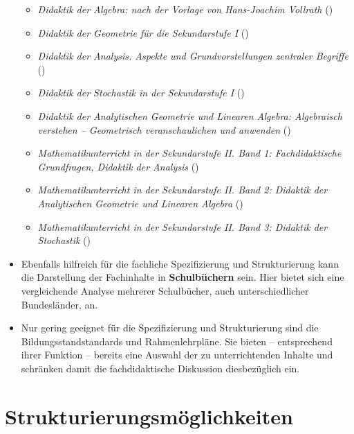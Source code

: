 \documentclass[
]{scrbook}
\providecommand{\tightlist}{%
  \setlength{\itemsep}{0pt}\setlength{\parskip}{0pt}}
\theoremstyle{definition}
\theoremstyle{definition}
\theoremstyle{definition}
\theoremstyle{definition}
\theoremstyle{remark}
\begin{document}
\begin{itemize}
  \begin{itemize}
  \tightlist
  \item
    \emph{Didaktik der Algebra: nach der Vorlage von Hans-Joachim Vollrath} ()
  \item
    \emph{Didaktik der Geometrie für die Sekundarstufe I} ()
  \item
    \emph{Didaktik der Analysis. Aspekte und Grundvorstellungen zentraler Begriffe} ()
  \item
    \emph{Didaktik der Stochastik in der Sekundarstufe I} ()
  \item
    \emph{Didaktik der Analytischen Geometrie und Linearen Algebra: Algebraisch verstehen -- Geometrisch veranschaulichen und anwenden} ()
  \item
    \emph{Mathematikunterricht in der Sekundarstufe II. Band 1: Fachdidaktische Grundfragen, Didaktik der Analysis} ()
  \item
    \emph{Mathematikunterricht in der Sekundarstufe II. Band 2: Didaktik der Analytischen Geometrie und Linearen Algebra} ()
  \item
    \emph{Mathematikunterricht in der Sekundarstufe II. Band 3: Didaktik der Stochastik} ()
  \end{itemize}
\item
  Ebenfalls hilfreich für die fachliche Spezifizierung und Strukturierung kann die Darstellung der Fachinhalte in \textbf{Schulbüchern} sein. Hier bietet sich eine vergleichende Analyse mehrerer Schulbücher, auch unterschiedlicher Bundesländer, an.
\item
  Nur gering geeignet für die Spezifizierung und Strukturierung sind die Bildungsstandstandards und Rahmenlehrpläne. Sie bieten -- entsprechend ihrer Funktion -- bereits eine Auswahl der zu unterrichtenden Inhalte und schränken damit die fachdidaktische Diskussion diesbezüglich ein.
\end{itemize}

\section{Strukturierungsmöglichkeiten}\label{strukturierungsmuxf6glichkeiten}
\end{document}
